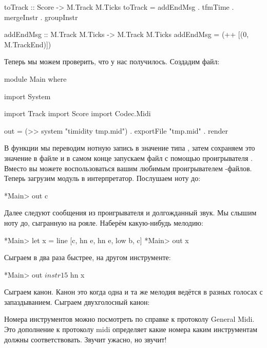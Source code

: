 \begin{code}
toTrack :: Score -> M.Track M.Ticks
toTrack = addEndMsg . tfmTime . mergeInstr . groupInstr

addEndMsg :: M.Track M.Ticks -> M.Track M.Ticks
addEndMsg = (++ [(0, M.TrackEnd)])
\end{code}

Теперь мы можем проверить, что у нас получилось. Создадим
файл:

\begin{code}
module Main where

import System

import Track
import Score
import Codec.Midi

out = (>> system "timidity tmp.mid") . 
    exportFile "tmp.mid" . render
\end{code}

В функции  мы переводим нотную запись в значение
типа , затем сохраняем это значение в файле
 и в самом конце запускаем файл с помощью 
проигрывателя . Вместо 
вы можете воспользоваться вашим любимым проигрывателем 
-файлов. Теперь загрузим модуль 
в интерпретатор. Послушаем ноту до:

\begin{code}
*Main> out c
\end{code}

Далее следуют сообщения из проигрывателя 
и долгожданный звук. Мы слышим ноту до, сыгранную на рояле.
Наберём какую-нибудь мелодию:

\begin{code}
*Main> let x = line [c, hn e, hn e, low b, c]
*Main> out x
\end{code}

Сыграем в два раза быстрее, на другом инструменте:

\begin{code}
*Main> out $ instr 15 $ hn x
\end{code}

Сыграем канон. Канон это когда одна и та же мелодия ведётся
в разных голосах с запаздыванием. Сыграем двухголосный канон:


Номера инструментов можно посмотреть по справке к протоколу
General Midi. Это дополнение к протоколу midi определяет
какие номера каким инструментам должны соответствовать.
Звучит ужасно, но звучит! 


